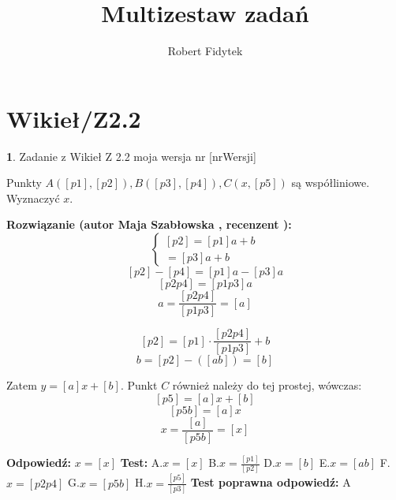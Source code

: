 \documentclass[12pt, a4paper]{article}
\title{Multizestaw zadań}
\author{Robert Fidytek}
\date{}
\theoremstyle{definition} %
\newtheorem{zad}{}
\newcommand{\kategoria}[1]{\section{#1}} %
\newcommand{\zadStart}[1]{\begin{zad}#1\newline} %
\newcommand{\zadStop}{\end{zad}}   %
\newcommand{\rozwStart}[2]{\noindent \textbf{Rozwiązanie (autor #1 , recenzent #2): }\newline} %
\newcommand{\rozwStop}{\newline}                                            %
\newcommand{\odpStart}{\noindent \textbf{Odpowiedź:}\newline}    %
\newcommand{\odpStop}{\newline}                                             %
\newcommand{\testStart}{\noindent \textbf{Test:}\newline} %
\newcommand{\testStop}{\newline} %
\newcommand{\kluczStart}{\noindent \textbf{Test poprawna odpowiedź:}\newline} %
\newcommand{\kluczStop}{\newline} %
\begin{document}
\maketitle


\kategoria{Wikieł/Z2.2}
\zadStart{Zadanie z Wikieł Z 2.2  moja wersja nr [nrWersji]}

Punkty $A([p1],[p2]), B([p3],[p4]), C(x,[p5])$ są współliniowe. Wyznaczyć $x$.
\zadStop

\rozwStart{Maja Szabłowska}{}
$$\left\{ \begin{array}{ll}
[p2]=[p1]a+b\\
[p4]=[p3]a+b
\end{array} \right.$$
$$[p2]-[p4]=[p1]a-[p3]a$$
$$[p2p4]=[p1p3]a$$
$$a=\frac{[p2p4]}{[p1p3]}=[a]$$

$$[p2]=[p1]\cdot\frac{[p2p4]}{[p1p3]}+b $$
$$b=[p2]-([ab])=[b]$$

Zatem $y=[a]x+[b].$ Punkt $C$ również należy do tej prostej, wówczas:
$$[p5]=[a]x+[b]$$
$$[p5b]=[a]x$$
$$x=\frac{[a]}{[p5b]}=[x]$$

\rozwStop


\odpStart
$x=[x]$
\odpStop
\testStart
A.$x=[x]$
B.$x=\frac{[p1]}{[p2]}$
D.$x=[b]$
E.$x=[ab]$
F.$x=[p2p4]$
G.$x=[p5b]$
H.$x=\frac{[p5]}{[p3]}$
\testStop
\kluczStart
A
\kluczStop
\end{document}
